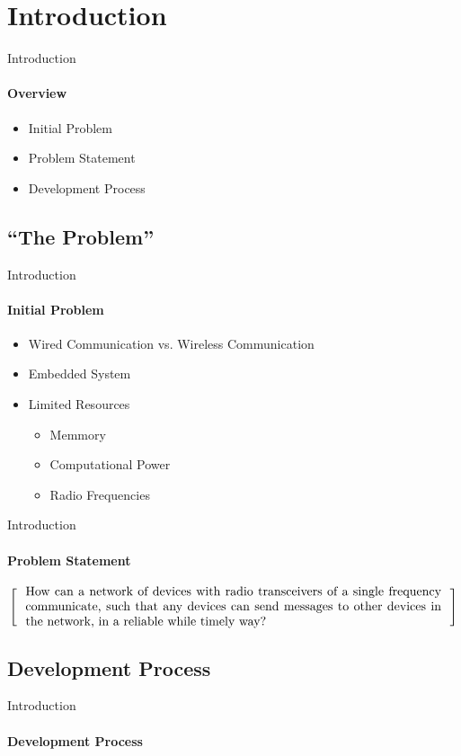 \section{Introduction}
\begin{frame}{Introduction}\framesubtitle{Overview}
    \begin{itemize}
        \item Initial Problem
        \item Problem Statement
        \item Development Process 
    \end{itemize}
\end{frame}
\subsection{``The Problem''}
\begin{frame}{Introduction}\framesubtitle{Initial Problem}
	\begin{itemize}
        \item Wired Communication vs. Wireless Communication
        \item Embedded System 
        \item Limited Resources
            \begin{itemize}
                \item Memmory
                \item Computational Power
                \item Radio Frequencies
            \end{itemize}
    \end{itemize}

\end{frame}
\begin{frame}{Introduction}\framesubtitle{Problem Statement}
\[
\left[
\begin{minipage}{\textwidth}
\centering
\begin{minipage}{0.96\textwidth}
How can a network of devices with radio transceivers of a single frequency communicate, such that any devices can send messages to other devices in the network, in a reliable while timely way?
\end{minipage}
\end{minipage}
\right]
\]
\end{frame}
\subsection{Development Process}
\begin{frame}{Introduction}\framesubtitle{Development Process}
	
\end{frame}

